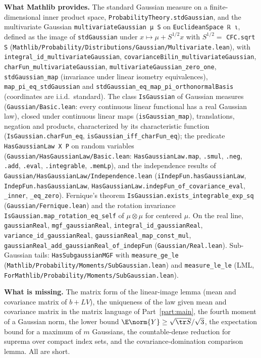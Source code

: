 \textbf{What Mathlib provides.} The standard Gaussian measure on a finite-dimensional inner
product space, \texttt{ProbabilityTheory.stdGaussian}, and the multivariate Gaussian
\texttt{multivariateGaussian μ S} on \texttt{EuclideanSpace ℝ ι}, defined as the image of
\texttt{stdGaussian} under $x \mapsto \mu + S^{1/2}x$ with $S^{1/2} = $ \texttt{CFC.sqrt S}
(\texttt{Mathlib/Probability/Distributions/Gaussian/Multivariate.lean}), with
\texttt{integral\_id\_multivariateGaussian}, \texttt{covarianceBilin\_multivariateGaussian},
\texttt{charFun\_multivariateGaussian}, \texttt{multivariateGaussian\_zero\_one},
\texttt{stdGaussian\_map} (invariance under linear isometry equivalences),
\texttt{map\_pi\_eq\_stdGaussian} and \texttt{stdGaussian\_eq\_map\_pi\_orthonormalBasis}
(coordinates are i.i.d.\ standard). The class \texttt{IsGaussian} of Gaussian measures
(\texttt{Gaussian/Basic.lean}: every continuous linear functional has a real Gaussian law),
closed under continuous linear maps (\texttt{isGaussian\_map}), translations, negation and
products, characterized by its characteristic function
(\texttt{IsGaussian.charFun\_eq}, \texttt{isGaussian\_iff\_charFun\_eq}); the predicate
\texttt{HasGaussianLaw X P} on random variables
(\texttt{Gaussian/HasGaussianLaw/Basic.lean}: \texttt{HasGaussianLaw.map}, \texttt{.smul},
\texttt{.neg}, \texttt{.add}, \texttt{.eval}, \texttt{.integrable}, \texttt{.memLp}), and the
independence results of \texttt{Gaussian/HasGaussianLaw/Independence.lean}
(\texttt{iIndepFun.hasGaussianLaw}, \texttt{IndepFun.hasGaussianLaw},
\texttt{HasGaussianLaw.indepFun\_of\_covariance\_eval}, \texttt{\_inner},
\texttt{\_eq\_zero}). Fernique's theorem \texttt{IsGaussian.exists\_integrable\_exp\_sq}
(\texttt{Gaussian/Fernique.lean}) and the rotation invariance
\texttt{IsGaussian.map\_rotation\_eq\_self} of $\mu \otimes \mu$ for centered $\mu$. On the real
line, \texttt{gaussianReal}, \texttt{mgf\_gaussianReal}, \texttt{integral\_id\_gaussianReal},
\texttt{variance\_id\_gaussianReal}, \texttt{gaussianReal\_map\_const\_mul},
\texttt{gaussianReal\_add\_gaussianReal\_of\_indepFun} (\texttt{Gaussian/Real.lean}).
Sub-Gaussian tails: \texttt{HasSubgaussianMGF} with \texttt{measure\_ge\_le}
(\texttt{Mathlib/Probability/Moments/SubGaussian.lean}) and \texttt{measure\_le\_le}
(LML, \texttt{ForMathlib/Probability/Moments/SubGaussian.lean}).

\textbf{What is missing.} The matrix form of the linear-image lemma (mean and covariance
matrix of $b + LV$), the uniqueness of the law given mean and covariance matrix in the
matrix language of Part~\ref{part:main}, the fourth moment of a Gaussian norm, the
lower bound $\E\norm{Y} \ge \sqrt{\tr S}/\sqrt 3$, the expectation bound for a maximum of $m$
Gaussians, the countable-dense reduction for suprema over compact index sets, and the
covariance-domination comparison lemma. All are short.

